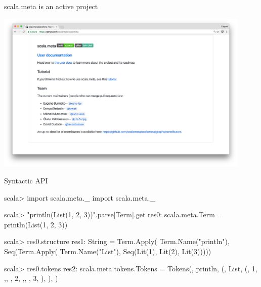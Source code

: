 \documentclass[svgnames,dvipsnames,hyperref={bookmarks=false},usepdftitle=false]{beamer}
\begin{document}
\begin{frame}{scala.meta is an active project}
\begin{center}
\includegraphics[height=7.75cm]{is-a-welcoming-community.png}
\end{center}
\end{frame}


\begin{frame}[fragile]{Syntactic API}
\begin{semiverbatim}
scala> import scala.meta._
import scala.meta._

scala> "println(List(1, 2, 3))".parse[Term].get
res0: scala.meta.Term = println(List(1, 2, 3))

scala> res0.structure
res1: String = Term.Apply(
  Term.Name("println"),
  Seq(Term.Apply(
    Term.Name("List"),
    Seq(Lit(1), Lit(2), Lit(3)))))

scala> res0.tokens
res2: scala.meta.tokens.Tokens =
Tokens(, println, (, List, (, 1, ,,  , 2, ,,  , 3, ), ), )
\end{semiverbatim}
\end{frame}
\end{document}
